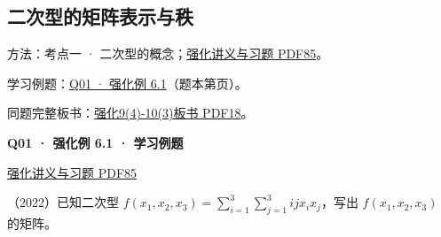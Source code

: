 \documentclass[UTF8,fontset=fandol,11pt,a4paper]{ctexart}
\newcommand{\source}[1]{{\footnotesize\color{Muted}#1\par}}
\newcommand{\qtitle}[2]{\par\needspace{5\baselineskip}\hypertarget{#1}{}\label{#1}\textbf{#2}\par}
\begin{document}
\subsection*{二次型的矩阵表示与秩}
\hypertarget{node-PRE}{}
方法：考点一 · 二次型的概念；\href{file:///Users/skyintelligence/Desktop/\%E5\%BE\%97\%E8\%AF\%BB\%E4\%B8\%AA\%E7\%A0\%94-\%E5\%8C\%97\%E5\%A4\%A7\%E8\%BD\%AF\%E5\%BE\%AE/\%E6\%95\%B0\%E5\%AD\%A6\%20150/Kira\%C2\%B727\%E7\%BA\%BF\%E6\%80\%A7\%E4\%BB\%A3\%E6\%95\%B0\%E5\%BC\%BA\%E5\%8C\%96\%E8\%AE\%B2\%E4\%B9\%89\%2B\%E4\%B9\%A0\%E9\%A2\%98.pdf\#page=85}{强化讲义与习题 PDF85}。\par
学习例题：\hyperlink{R-EX-01}{Q01 · 强化例 6.1}（题本第\pageref*{R-EX-01}页）。\par
同题完整板书：\href{file:///Users/skyintelligence/Desktop/\%E5\%BE\%97\%E8\%AF\%BB\%E4\%B8\%AA\%E7\%A0\%94-\%E5\%8C\%97\%E5\%A4\%A7\%E8\%BD\%AF\%E5\%BE\%AE/\%E6\%95\%B0\%E5\%AD\%A6\%20150/\%E7\%BA\%BF\%E6\%80\%A7\%E4\%BB\%A3\%E6\%95\%B0/\%E7\%BA\%BF\%E4\%BB\%A3\%E5\%BC\%BA\%E5\%8C\%969\%284\%29-10\%283\%29\%20\%20\%E7\%AC\%AC\%E4\%BA\%94\%E5\%85\%AD\%E7\%AB\%A0\%20\%E5\%AE\%9E\%E5\%AF\%B9\%E7\%A7\%B0\%E7\%9F\%A9\%E9\%98\%B5\%26\%E4\%BA\%8C\%E6\%AC\%A1\%E5\%9E\%8B1\%E3\%80\%90\%E4\%BE\%8B5.6\%E3\%80\%91-\%E3\%80\%90\%E4\%BE\%8B6.4\%E3\%80\%91.pdf\#page=18}{强化9(4)-10(3)板书 PDF18}。\par
\vspace{3mm}
\begin{minipage}{\linewidth}
\qtitle{R-EX-01}{Q01 · 强化例 6.1 · 学习例题}
\source{\href{file:///Users/skyintelligence/Desktop/\%E5\%BE\%97\%E8\%AF\%BB\%E4\%B8\%AA\%E7\%A0\%94-\%E5\%8C\%97\%E5\%A4\%A7\%E8\%BD\%AF\%E5\%BE\%AE/\%E6\%95\%B0\%E5\%AD\%A6\%20150/Kira\%C2\%B727\%E7\%BA\%BF\%E6\%80\%A7\%E4\%BB\%A3\%E6\%95\%B0\%E5\%BC\%BA\%E5\%8C\%96\%E8\%AE\%B2\%E4\%B9\%89\%2B\%E4\%B9\%A0\%E9\%A2\%98.pdf\#page=85}{强化讲义与习题 PDF85}}
（2022）已知二次型 $f(x_1,x_2,x_3)=\displaystyle\sum_{i=1}^{3}\sum_{j=1}^{3}ijx_ix_j$，写出 $f(x_1,x_2,x_3)$ 的矩阵。
\end{minipage}\par\vspace{7mm}
\end{document}
